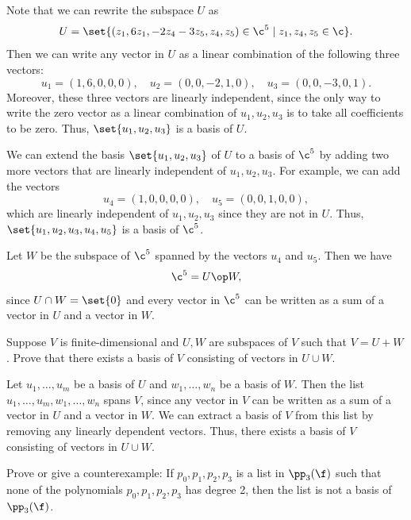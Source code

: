 \begin{sole}
    \item Note that we can rewrite the subspace $U$ as
    \[U = \set{(z_1, 6z_1, -2z_4 - 3z_5, z_4, z_5) \in \c^5 \mid z_1, z_4, z_5 \in \c}.\]
    Then we can write any vector in $U$ as a linear combination of the following three vectors:
    \[u_1 = (1, 6, 0, 0, 0), \quad u_2 = (0, 0, -2, 1, 0), \quad u_3 = (0, 0, -3, 0, 1).\]
    Moreover, these three vectors are linearly independent, since the only way to write the zero vector as a linear combination of $u_1, u_2, u_3$ is to take all coefficients to be zero. Thus, $\set{u_1, u_2, u_3}$ is a basis of $U$.
    \item We can extend the basis $\set{u_1, u_2, u_3}$ of $U$ to a basis of $\c^5$ by adding two more vectors that are linearly independent of $u_1, u_2, u_3$. For example, we can add the vectors
    \[u_4 = (1, 0, 0, 0, 0), \quad u_5 = (0, 0, 1, 0, 0),\]
    which are linearly independent of $u_1, u_2, u_3$ since they are not in $U$. Thus, $\set{u_1, u_2, u_3, u_4, u_5}$ is a basis of $\c^5$.
    \item Let $W$ be the subspace of $\c^5$ spanned by the vectors $u_4$ and $u_5$. Then we have
    \[\c^5 = U \op W,\]
    since $U \cap W = \set{0}$ and every vector in $\c^5$ can be written as a sum of a vector in $U$ and a vector in $W$.
\end{sole}

\begin{exercise}[2b5]
    Suppose $V$ is finite-dimensional and $U, W$ are subspaces of $V$ such that $V = U + W$. Prove that there exists a basis of $V$ consisting of vectors in $U \cup W$.
\end{exercise}

\begin{sol}
    Let $u_1, \ldots, u_m$ be a basis of $U$ and $w_1, \ldots, w_n$ be a basis of $W$. Then the list $u_1, \ldots, u_m, w_1, \ldots, w_n$ spans $V$, since any vector in $V$ can be written as a sum of a vector in $U$ and a vector in $W$. We can extract a basis of $V$ from this list by removing any linearly dependent vectors. Thus, there exists a basis of $V$ consisting of vectors in $U \cup W$.
\end{sol}

\begin{exercise}[2b6]
    Prove or give a counterexample: If $p_0, p_1, p_2, p_3$ is a list in $\pp_3(\f)$ such that none of the polynomials $p_0, p_1, p_2, p_3$ has degree 2, then the list is not a basis of $\pp_3(\f)$.
\end{exercise}

